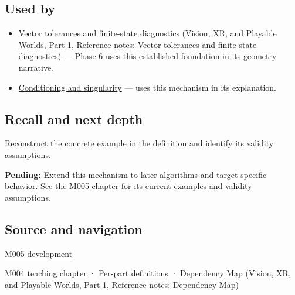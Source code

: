 \subsection{Used by}\label{appendix-0ec599f8ba27-used-by}

\hypertarget{appendix-0ec599f8ba27-used-by}{}

\begin{itemize}
\item
  \href{../07-Vision-XR-and-Playable-Worlds-P01/main.pdf\#nameddest=appendix-b5b83329215b}{Vector tolerances and finite-state diagnostics (Vision, XR, and Playable Worlds, Part 1, Reference notes: Vector tolerances and finite-state diagnostics)} --- Phase 6 uses this established foundation in its geometry narrative.
\item
  \hyperref[appendix-8f6a01f284a7]{Conditioning and singularity} --- uses this mechanism in its explanation.
\end{itemize}

\subsection{Recall and next depth}\label{appendix-0ec599f8ba27-recall-and-next-depth}

\hypertarget{appendix-0ec599f8ba27-recall-and-next-depth}{}

Reconstruct the concrete example in the definition and identify its validity assumptions.

\textbf{Pending:} Extend this mechanism to later algorithms and target-specific behavior. See the M005 chapter for its current examples and validity assumptions.

\subsection{Source and navigation}\label{appendix-0ec599f8ba27-source-and-navigation}

\hypertarget{appendix-0ec599f8ba27-source-and-navigation}{}

\hyperref[01-foundations-i-ch001-when-arithmetic-meets-uncertainty]{M005 development}

\hyperref[01-foundations-i-ch001-a-stretching-ruler-for-real-valued-quantities]{M004 teaching chapter} · \hyperref[appendix-fd090d982a15-m004---parts-61-76]{Per-part definitions} · \href{../07-Vision-XR-and-Playable-Worlds-P01/main.pdf\#nameddest=appendix-4ad47bdd269a}{Dependency Map (Vision, XR, and Playable Worlds, Part 1, Reference notes: Dependency Map)}
